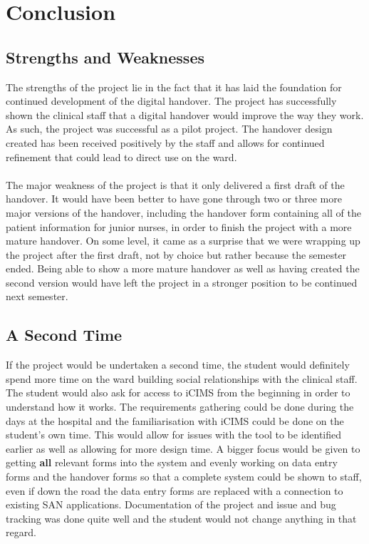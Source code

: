 \section{Conclusion}
\subsection{Strengths and Weaknesses}
The strengths of the project lie in the fact that it has laid the foundation for continued development of the digital handover. The project has successfully shown the clinical staff that a digital handover would improve the way they work. As such, the project was successful as a pilot project. The handover design created has been received positively by the staff and allows for continued refinement that could lead to direct use on the ward. 
\\ \\ 
The major weakness of the project is that it only delivered a first draft of the handover. It would have been better to have gone through two or three more major versions of the handover, including the handover form containing all of the patient information for junior nurses, in order to finish the project with a more mature handover. On some level, it came as a surprise that we were wrapping up the project after the first draft, not by choice but rather because the semester ended. Being able to show a more mature handover as well as having created the second version would have left the project in a stronger position to be continued next semester.

\subsection{A Second Time}
If the project would be undertaken a second time, the student would definitely spend more time on the ward building social relationships with the clinical staff. The student would also ask for access to iCIMS from the beginning in order to understand how it works. The requirements gathering could be done during the days at the hospital and the familiarisation with iCIMS could be done on the student's own time. This would allow for issues with the tool to be identified earlier as well as allowing for more design time. A bigger focus would be given to getting \textbf{all} relevant forms into the system and evenly working on data entry forms and the handover forms so that a complete system could be shown to staff, even if down the road the data entry forms are replaced with a connection to existing SAN applications. Documentation of the project and issue and bug tracking was done quite well and the student would not change anything in that regard.

